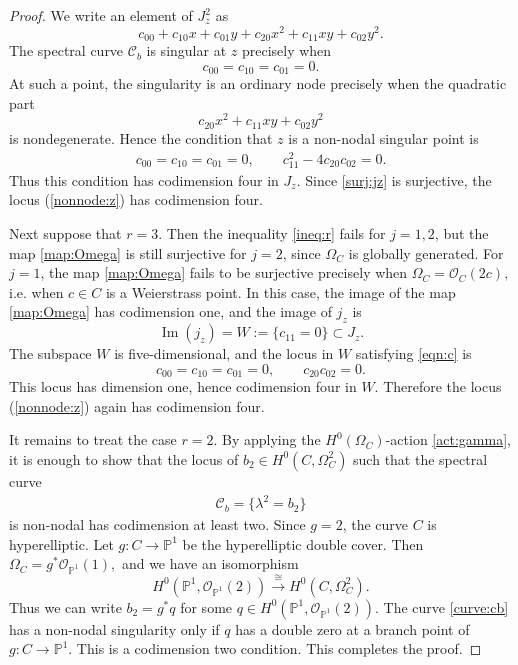 \documentclass[11pt,oneside,a4paper,mathscr]{amsart}
\theoremstyle{definition}
\newcommand{\cC}{\mathcal{C}}
\begin{document}
\begin{proof}
We write an element of \(J_z^2\) as
\[
c_{00}+c_{10}x+c_{01}y+c_{20}x^2+c_{11}xy+c_{02}y^2 .
\]
The spectral curve $\cC_b$ is singular at \(z\) precisely when
\[
c_{00}=c_{10}=c_{01}=0.
\]
At such a point, the singularity is an ordinary node precisely when the quadratic part
\[
c_{20}x^2+c_{11}xy+c_{02}y^2
\]
is nondegenerate. Hence the condition that \(z\) is a non-nodal singular point is
\begin{align}\label{eqn:c}
c_{00}=c_{10}=c_{01}=0,
\qquad
c_{11}^2-4c_{20}c_{02}=0.
\end{align}
Thus this condition has codimension four in \(J_z\).
Since \eqref{surj:jz} is surjective, the locus 
(\ref{nonnode:z}) has codimension four. 

Next suppose that $r=3$. Then the inequality \eqref{ineq:r} fails for 
$j=1,2$, but the map \eqref{map:Omega} is still surjective for $j=2$, since 
$\Omega_C$ is globally generated. For $j=1$, the map \eqref{map:Omega} fails 
to be surjective precisely when
$
\Omega_C=\mathcal{O}_C(2c),
$
i.e. when $c\in C$ is a Weierstrass point. 
In this case, the image of the map \eqref{map:Omega} has codimension one, and 
the image of $j_z$ is
\[
    \operatorname{Im}(j_z)=W:=\{c_{11}=0\}\subset J_z .
\]
The subspace $W$ is five-dimensional, and the locus in $W$ satisfying 
\eqref{eqn:c} is
\[
c_{00}=c_{10}=c_{01}=0,
\qquad
c_{20}c_{02}=0.
\]
This locus has dimension one, hence codimension four in $W$. Therefore the 
locus (\ref{nonnode:z}) again has 
codimension four. 

It remains to treat the case \(r=2\). By applying the 
$H^0(\Omega_C)$-action \eqref{act:gamma}, it is enough to show that the locus 
of $b_2\in H^0(C,\Omega_C^2)$ such that the spectral curve
\begin{align}\label{curve:cb}
    \cC_b=\{\lambda^2=b_2\}
\end{align}
is non-nodal has codimension at least two. 
Since \(g=2\), the curve \(C\) is hyperelliptic. Let
$
g \colon C \to \mathbb{P}^1
$
be the hyperelliptic double cover. Then
$
\Omega_C=g^*\mathcal{O}_{\mathbb{P}^1}(1),
$
and we have an isomorphism
\[
H^0(\mathbb{P}^1,\mathcal{O}_{\mathbb{P}^1}(2))
\stackrel{\cong}{\longrightarrow}
H^0(C,\Omega_C^2).
\]
Thus we can write $b_2=g^*q$ for some 
$q\in H^0(\mathbb{P}^1,\mathcal{O}_{\mathbb{P}^1}(2))$. 
The curve \eqref{curve:cb} has a non-nodal singularity only if $q$ has a 
double zero at a branch point of $g\colon C\to \mathbb{P}^1$. 
This is a codimension two condition. 
This completes the proof.
    \end{proof}
\end{document}
